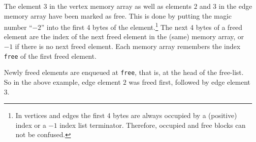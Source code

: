 \documentclass[a4paper]{article}
\begin{document}
\begin{center}
\end{center}
The element $3$ in the vertex memory array as well as elements $2$ and $3$ in the edge memory array have been marked as free.
This is done by putting the magic number ``$-2$'' into the first 4 bytes of the element.\footnote{
	In vertices and edges the first 4 bytes are always occupied by a (positive) index or a $-1$ index list terminator.
	Therefore, occupied and free blocks can not be confused.}
The next 4 bytes of a freed element are the index of the next freed element in the (same) memory array,
	or $-1$ if there is no next freed element.
Each memory array remembers the index \texttt{free} of the first freed element.

Newly freed elements are enqueued at \texttt{free}, that is, at the head of the free-list.
So in the above example, edge element $2$ was freed first, followed by edge element $3$.
\end{document}
